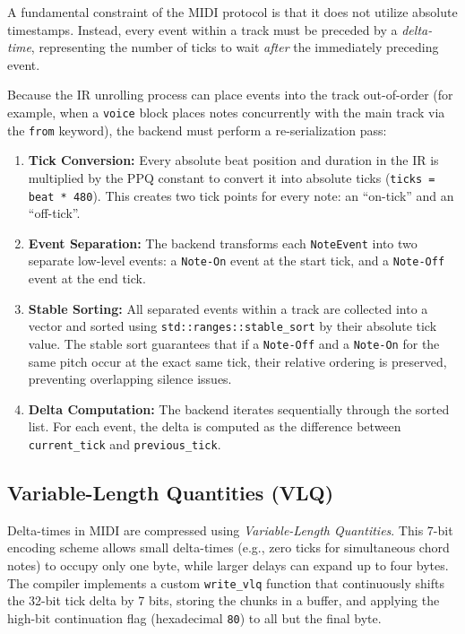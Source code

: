 A fundamental constraint of the MIDI protocol is that it does not utilize absolute timestamps.
Instead, every event within a track must be preceded by a \textit{delta-time}, representing the number of ticks to wait
\textit{after} the immediately preceding event.

Because the IR unrolling process can place events into the track out-of-order (for example, when a \texttt{voice} block
places notes concurrently with the main track via the \texttt{from} keyword), the backend must perform a
re-serialization pass:
\begin{enumerate}
  \item \textbf{Tick Conversion:} Every absolute beat position and duration in the IR is multiplied by the PPQ constant
    to convert it into absolute ticks (\texttt{ticks = beat * 480}).
    This creates two tick points for every note: an ``on-tick'' and an ``off-tick''.
  \item \textbf{Event Separation:} The backend transforms each \texttt{NoteEvent} into two separate low-level events: a
    \texttt{Note-On} event at the start tick, and a \texttt{Note-Off} event at the end tick.
  \item \textbf{Stable Sorting:} All separated events within a track are collected into a vector and sorted using
    \texttt{std::ranges::stable\_sort} by their absolute tick value.
    The stable sort guarantees that if a \texttt{Note-Off} and a \texttt{Note-On} for the same pitch occur at the exact
    same tick, their relative ordering is preserved, preventing overlapping silence issues.
  \item \textbf{Delta Computation:} The backend iterates sequentially through the sorted list.
    For each event, the delta is computed as the difference between \texttt{current\_tick} and
    \texttt{previous\_tick}.
\end{enumerate}

\subsection{Variable-Length Quantities (VLQ)}\label{subsec:variable-length-quantities-(vlq)}

Delta-times in MIDI are compressed using \textit{Variable-Length Quantities}.
This 7-bit encoding scheme allows small delta-times (e.g., zero ticks for simultaneous chord notes) to occupy only one
byte, while larger delays can expand up to four bytes.
The compiler implements a custom \texttt{write\_vlq} function that continuously shifts the 32-bit tick delta by 7 bits,
storing the chunks in a buffer, and applying the high-bit continuation flag (hexadecimal \texttt{80}) to all but the
final byte.

